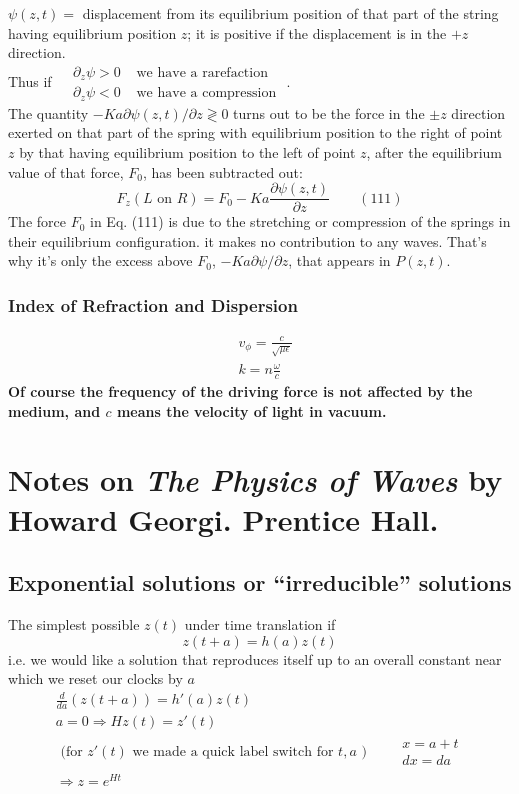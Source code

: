 \documentclass[twoside, 10pt]{amsart}
\begin{document}
$\psi(z,t) = $ displacement from its equilibrium position of that part of the string having equilibrium position $z$; it is positive if the displacement is in the $+z$ direction.  \\
\phantom{displacement} Thus if $\begin{aligned} 
  & \partial_z \psi > 0 & \text{ we have a rarefaction } \\
  &  \partial_z \psi < 0 & \text{ we have a compression } 
\end{aligned}$.  \\
The quantity $-Ka \partial \psi(z,t)/\partial z \gtrless 0$ turns out to be the force in the $\pm z$ direction exerted on that part of the spring with equilibrium position to the right of point $z$ by that having equilibrium position to the left of point $z$, after the equilibrium value of that force, $F_0$, has been subtracted out:
\[
F_z(L \text{ on } R) = F_0 - Ka \frac{ \partial \psi(z,t) }{\partial z } \quad \quad (111)
\]
The force $F_0$ in Eq. (111) is due to the stretching or compression of the springs in their equilibrium configuration.  it makes no contribution to any waves.  That's why it's only the excess above $F_0$, $-Ka \partial \psi/\partial z$, that appears in $P(z,t)$.  
\subsubsection*{ Index of Refraction and Dispersion }
\begin{align}
  & \boxed{ v_{\phi} = \frac{c}{ \sqrt{ \mu \epsilon }} } \\
    & k = n \frac{ \omega}{ c} 
\end{align}
\textbf{ Of course the frequency of the driving force is not affected by the medium, and $c$ means the velocity of light in vacuum.  }

\section{ Notes on \emph{The Physics of Waves} by Howard Georgi.  Prentice Hall.  }

\subsection{ Exponential solutions or ``irreducible'' solutions }

The simplest possible $z(t)$ under time translation if 
\begin{equation}
z(t +a) = h(a) z(t)
\end{equation}
i.e. we would like a solution that reproduces itself up to an overall constant near which we reset our clocks by $a$  
\[
\begin{gathered}
\frac{d}{da} (z(t+a)) = h'(a) z(t)   \\
a = 0 \Longrightarrow Hz(t) = z'(t)   \\
\text{ (for $z'(t)$ we made a quick label switch for $t,a$ ) } \quad \begin{aligned} & x = a+t \\ & dx = da \end{aligned}  \\
\Longrightarrow z = e^{Ht}
\end{gathered}
\]
\end{document}
